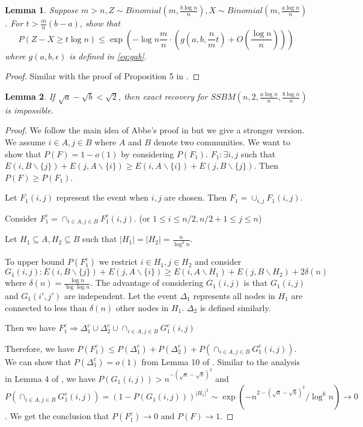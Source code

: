 \documentclass{article}
\newtheorem{lemma}{Lemma}
\begin{document}
\begin{lemma}
	Suppose $m > n, Z \sim
	Binomial(m, \frac{b\log n}{n}), X\sim Binomial(m, \frac{a\log n}{n})$.
	For $ t > \frac{m}{n}(b - a)$, show that
	\begin{equation}
	P(Z - X \geq t \log n) \leq \exp(-\log n \frac{m}{n}\cdot ( g(a, b, \frac{n}{m}t) + O(\frac{\log n}{n})))
	\end{equation}
	where $g(a,b,\epsilon)$ is defined in \eqref{eq:gab}.
\end{lemma}
\begin{proof}
	Similar with the proof of Proposition 5 in \cite{yemin}.
\end{proof}

\begin{lemma}\label{lem:ab2}
	If $\sqrt{a} - \sqrt{b} < \sqrt{2}$, then exact recovery for $SSBM(n, 2, \frac{a \log n}{n}, \frac{b \log n}{n})$
	is impossible.
\end{lemma}
\begin{proof}
	We follow the main idea of Abbe's proof in \cite{abbe} but we give a stronger version.
	We assume $i \in A, j \in B$ where $A$ and $B$ denote two communities.
	We want to show that $P(F) = 1 - o(1)$ by considering $P(F_1)$.
	$F_1: \exists i,j$ such that $E(i, B \backslash \{j\}) + E(j, A \backslash \{i\}) \geq E(i, A \backslash \{i\}) + E(j, B \backslash \{j\})$.
	Then $P(F) \geq P(F_1)$.
	
	Let $F_1(i,j)$ represent the event when $i,j$ are chosen. Then $F_1 = \cup_{i,j}F_1(i,j)$.
	
	Consider $F_1^c = \cap_{i\in A, j\in B} F_1^c(i,j)$. (or $1\leq i \leq n/2, n/2+1 \leq j \leq n$)
	
	Let $H_1\subseteq A, H_2 \subseteq B$ such that $|H_1| = |H_2| = \frac{n}{\log^3 n}$.
	
	To upper bound $P(F_1^c)$ we restrict $i \in H_1, j \in H_2$ and consider
	$G_1(i,j): E(i, B \backslash \{j\}) + E(j, A \backslash \{i\}) \geq E(i, A \backslash H_1) + E(j, B \backslash H_2) + 2\delta(n)$
	where $\delta(n) = \frac{\log n}{\log \log n}$.
	The advantage of considering $G_1(i,j)$ is that $G_1(i,j)$ and $G_1(i', j')$ are independent.
	Let the event $\Delta_1$ represents all nodes in $H_1$ are connected to less than $\delta(n)$ other nodes in $H_1$.
	$\Delta_2$ is defined similarly.
	
	Then we have $F_1^c \Rightarrow \Delta_1^c \cup \Delta_2^c \cup \cap_{i\in A, j\in B}G^c_1(i,j)$
	
	Therefore, we have $P(F_1^c) \leq P(\Delta_1^c) + P(\Delta_2^c) + P(\cap_{i\in A, j\in B}G^c_1(i,j))$.
	We can show that $P(\Delta_1^c) = o(1)$ from Lemma 10 of \cite{abbe}.
	Similar to the analysis in Lemma 4 of \cite{abbe}, we have $P(G_1(i,j)) > n^{-(\sqrt{a} - \sqrt{b})^2}$
	and $P(\cap_{i\in A, j\in B}G^c_1(i,j)) = (1 - P(G_1(i,j)))^{|H_1|^2} \sim \exp(-n^{2 - (\sqrt{a} - \sqrt{b})^2}/\log^6 n) \to 0$.
	We get the conclusion that $P(F_1^c) \to 0$ and $P(F) \to 1$.
	
\end{proof}
\end{document}
